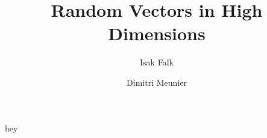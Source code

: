 \documentclass{beamer}
\title[]{Random Vectors in High Dimensions}
\author[]{Isak Falk \and Dimitri Meunier}
\begin{document}
\begin{frame}
  \titlepage%
  
  hey
\end{frame}
\end{document}
